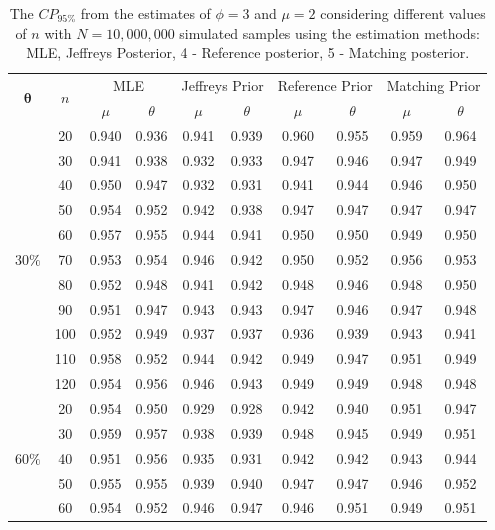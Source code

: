 \documentclass[12pt]{article} %
\theoremstyle{plain}%
\theoremstyle{definition}
\theoremstyle{remark}
\begin{document}
\begin{table}[!h]
\centering
\caption{The $CP_{95\%}$ from the estimates of $\phi=3$ and $\mu=2$ considering different values of $n$  with $N=10,000,000$ simulated samples using the estimation methods:  MLE,  Jeffreys Posterior, 4 - Reference posterior, 5 - Matching posterior.}
{\scriptsize
\begin{tabular}{c|c|c|c|c|c|c|c|c|c}
\hline
\multirow{2}{*}{$\boldsymbol{\theta}$ }  & \multirow{2}{*}{$n$ }  & \multicolumn{2}{c|}{MLE} & \multicolumn{2}{c|}{Jeffreys Prior} & \multicolumn{2}{c|}{Reference Prior}  & \multicolumn{2}{c}{Matching Prior} \\  &  &    $\mu$ & $\theta$ & $\mu$ & $\theta$ & $\mu$ & $\theta$  & $\mu$ & $\theta$ \\
\hline
\multirow{11}{*}{$30\%$} 
&  20 & 0.940 & 0.936 & 0.941 & 0.939 & 0.960 & 0.955 & 0.959 & 0.964 \\
&  30 & 0.941 & 0.938 & 0.932 & 0.933 & 0.947 & 0.946 & 0.947 & 0.949 \\
&  40 & 0.950 & 0.947 & 0.932 & 0.931 & 0.941 & 0.944 & 0.946 & 0.950 \\
&  50 & 0.954 & 0.952 & 0.942 & 0.938 & 0.947 & 0.947 & 0.947 & 0.947 \\
&  60 & 0.957 & 0.955 & 0.944 & 0.941 & 0.950 & 0.950 & 0.949 & 0.950 \\
&  70 & 0.953 & 0.954 & 0.946 & 0.942 & 0.950 & 0.952 & 0.956 & 0.953 \\
&  80 & 0.952 & 0.948 & 0.941 & 0.942 & 0.948 & 0.946 & 0.948 & 0.950 \\
&  90 & 0.951 & 0.947 & 0.943 & 0.943 & 0.947 & 0.946 & 0.947 & 0.948 \\
&  100 & 0.952 & 0.949 & 0.937 & 0.937 & 0.936 & 0.939 & 0.943 & 0.941 \\
&  110 & 0.958 & 0.952 & 0.944 & 0.942 & 0.949 & 0.947 & 0.951 & 0.949 \\
&  120 & 0.954 & 0.956 & 0.946 & 0.943 & 0.949 & 0.949 & 0.948 & 0.948 \\ \hline
\multirow{11}{*}{$60\%$}
&  20 & 0.954 & 0.950 & 0.929 & 0.928 & 0.942 & 0.940 & 0.951 & 0.947 \\
&  30 & 0.959 & 0.957 & 0.938 & 0.939 & 0.948 & 0.945 & 0.949 & 0.951 \\
&  40 & 0.951 & 0.956 & 0.935 & 0.931 & 0.942 & 0.942 & 0.943 & 0.944 \\
&  50 & 0.955 & 0.955 & 0.939 & 0.940 & 0.947 & 0.947 & 0.946 & 0.952 \\
&  60 & 0.954 & 0.952 & 0.946 & 0.947 & 0.946 & 0.951 & 0.949 & 0.951 \\

\end{tabular}}
\end{table}
\end{document}
